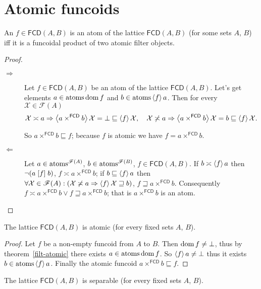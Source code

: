 \section{Atomic funcoids}
\begin{thm}
An $f\in\mathsf{FCD}(A,B)$ is an atom of the lattice $\mathsf{FCD}(A,B)$
(for some sets $A$, $B$) iff it is a funcoidal product of two atomic
filter objects.\end{thm}
\begin{proof}
~
\begin{description}
\item [{$\Rightarrow$}] Let $f\in\mathsf{FCD}(A,B)$ be an atom of the
lattice $\mathsf{FCD}(A,B)$. Let's get elements $a\in\operatorname{atoms}\operatorname{dom} f$
and $b\in\operatorname{atoms}\left\langle f\right\rangle a$. Then for every $\mathcal{X}\in\mathscr{F}(A)$
\[
\mathcal{X}\asymp
a\Rightarrow\left\langle a\times^{\mathsf{FCD}}b\right\rangle\mathcal{X}=\bot
\sqsubseteq\left\langle f\right\rangle\mathcal{X},\quad\mathcal{X}\not\asymp
a\Rightarrow\left\langle a\times^{\mathsf{FCD}}b\right\rangle\mathcal{X}=b\sqsubseteq\left\langle f\right\rangle\mathcal{X}.
\]



So $a\times^{\mathsf{FCD}}b\sqsubseteq f$; because $f$ is atomic we
have $f=a\times^{\mathsf{FCD}}b$.

\item [{$\Leftarrow$}] Let $a\in\operatorname{atoms}^{\mathscr{F}(A)}$,
$b\in\operatorname{atoms}^{\mathscr{F}(B)}$,
$f\in\mathsf{FCD}(A,B)$. If $b\asymp\left\langle f\right\rangle a$ then $\lnot(a\mathrel{\left[f\right]}b)$,
$f\asymp a\times^{\mathsf{FCD}}b$; if $b\sqsubseteq\left\langle f\right\rangle a$ then
$\forall\mathcal{X}\in\mathscr{F}(A):(\mathcal{X}\not\asymp a\Rightarrow\left\langle f\right\rangle\mathcal{X}\sqsupseteq b)$,
$f\sqsupseteq a\times^{\mathsf{FCD}}b$. Consequently $f\asymp
a\times^{\mathsf{FCD}}b\lor f\sqsupseteq a\times^{\mathsf{FCD}}b$;
that is $a\times^{\mathsf{FCD}}b$ is an atom.
\end{description}
\end{proof}
\begin{thm}
The lattice $\mathsf{FCD}(A,B)$ is atomic (for every fixed sets $A$, $B$).\end{thm}
\begin{proof}
Let $f$ be a non-empty funcoid from $A$ to $B$. Then $\operatorname{dom}
f\ne\bot$,
thus by theorem~\ref{filt-atomic} there exists $a\in\operatorname{atoms}\operatorname{dom} f$.
So $\left\langle f\right\rangle a\ne\bot$ thus it exists $b\in\operatorname{atoms}\left\langle f\right\rangle a$.
Finally the atomic funcoid $a\times^{\mathsf{FCD}}b\sqsubseteq f$.\end{proof}
\begin{thm}
The lattice $\mathsf{FCD}(A,B)$ is separable (for every fixed sets $A$,
$B$).\end{thm}
